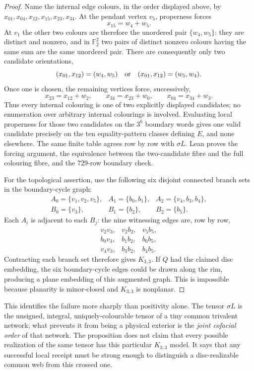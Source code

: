 \begin{proof}
Name the internal edge colours, in the order displayed above, by
$x_{01},x_{04},x_{12},x_{15},x_{23},x_{34}$.  At the pendant vertex $v_5$,
properness forces
\[
                         x_{15}=w_4+w_5.
\]
At $v_1$ the other two colours are therefore the unordered pair
$\{w_4,w_5\}$: they are distinct and nonzero, and in $\mathbb F_2^2$ two
pairs of distinct nonzero colours having the same sum are the same unordered
pair.  There are consequently only two candidate orientations,
\[
 (x_{01},x_{12})=(w_4,w_5)
       \quad\hbox{or}\quad
 (x_{01},x_{12})=(w_5,w_4).
\]
Once one is chosen, the remaining vertices force, successively,
\[
 x_{23}=x_{12}+w_2,\qquad
 x_{34}=x_{23}+w_0,\qquad
 x_{04}=x_{34}+w_3.
\]
Thus every internal colouring is one of two explicitly displayed candidates;
no enumeration over arbitrary internal colourings is involved.  Evaluating
local properness for those two candidates on the $3^6$ boundary words gives
one valid candidate precisely on the ten equality-pattern classes defining
$E$, and none elsewhere.  The same finite table agrees row by row with
$\sigma L$.  Lean proves the forcing argument, the equivalence between the
two-candidate fibre and the full colouring fibre, and the $729$-row boundary
check.

For the topological assertion, use the following six disjoint connected
branch sets in the boundary-cycle graph:
\[
\begin{array}{lll}
A_0=\{v_1,v_2,v_5\},&A_1=\{b_0,b_1\},&
A_2=\{v_4,b_3,b_4\},\\
B_0=\{v_3\},&B_1=\{b_2\},&B_2=\{b_5\}.
\end{array}
\]
Each $A_i$ is adjacent to each $B_j$: the nine witnessing edges are,
row by row,
\[
\begin{array}{lll}
v_2v_3,&v_2b_2,&v_5b_5,\\
b_0v_3,&b_1b_2,&b_0b_5,\\
v_4v_3,&b_3b_2,&b_4b_5.
\end{array}
\]
Contracting each branch set therefore gives $K_{3,3}$.  If $Q$ had the
claimed disc embedding, the six boundary-cycle edges could be drawn along
the rim, producing a plane embedding of this augmented graph.  This is
impossible because planarity is minor-closed and $K_{3,3}$ is nonplanar.
\end{proof}

This identifies the failure more sharply than positivity alone.  The tensor
$\sigma L$ is the unsigned, integral, uniquely-colourable tensor of a tiny
common trivalent network; what prevents it from being a physical exterior is
the \emph{joint cofacial order} of that network.  The proposition does not
claim that every possible realization of the same tensor has this particular
$K_{3,3}$ model.  It says that any successful local receipt must be strong
enough to distinguish a disc-realizable common web from this crossed one.

